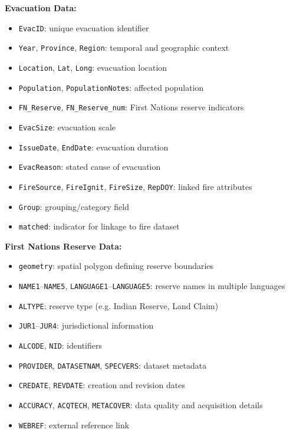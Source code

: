 \cite{evacdb} \textbf{Evacuation Data:}
\begin{itemize}
    \item \texttt{EvacID}: unique evacuation identifier
    \item \texttt{Year}, \texttt{Province}, \texttt{Region}: temporal and geographic context
    \item \texttt{Location}, \texttt{Lat}, \texttt{Long}: evacuation location
    \item \texttt{Population}, \texttt{PopulationNotes}: affected population
    \item \texttt{FN\_Reserve}, \texttt{FN\_Reserve\_num}: First Nations reserve indicators
    \item \texttt{EvacSize}: evacuation scale
    \item \texttt{IssueDate}, \texttt{EndDate}: evacuation duration
    \item \texttt{EvacReason}: stated cause of evacuation
    \item \texttt{FireSource}, \texttt{FireIgnit}, \texttt{FireSize}, \texttt{RepDOY}: linked fire attributes
    \item \texttt{Group}: grouping/category field
    \item \texttt{matched}: indicator for linkage to fire dataset
\end{itemize}

\cite{reservesdb} \textbf{First Nations Reserve Data:}
\begin{itemize}
    \item \texttt{geometry}: spatial polygon defining reserve boundaries
    \item \texttt{NAME1}–\texttt{NAME5}, \texttt{LANGUAGE1}–\texttt{LANGUAGE5}: reserve names in multiple languages
    \item \texttt{ALTYPE}: reserve type (e.g. Indian Reserve, Land Claim)
    \item \texttt{JUR1}–\texttt{JUR4}: jurisdictional information
    \item \texttt{ALCODE}, \texttt{NID}: identifiers
    \item \texttt{PROVIDER}, \texttt{DATASETNAM}, \texttt{SPECVERS}: dataset metadata
    \item \texttt{CREDATE}, \texttt{REVDATE}: creation and revision dates
    \item \texttt{ACCURACY}, \texttt{ACQTECH}, \texttt{METACOVER}: data quality and acquisition details
    \item \texttt{WEBREF}: external reference link
\end{itemize}

